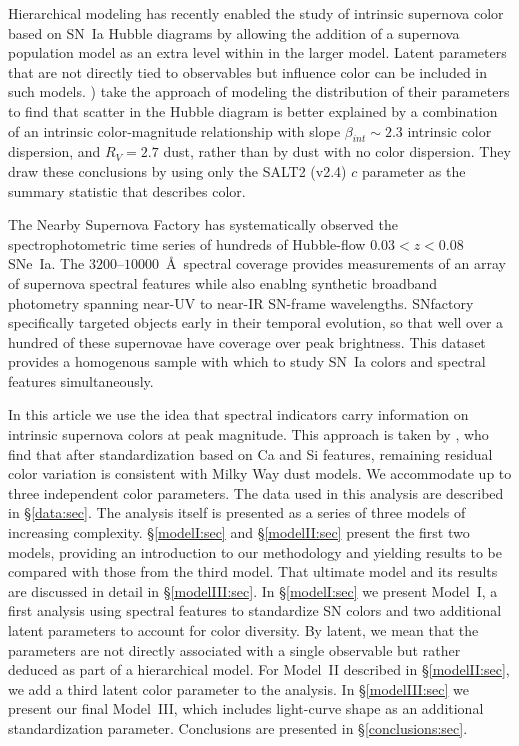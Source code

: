\documentclass[trackchanges]{aastex62}   	%
\begin{document}
Hierarchical modeling has recently enabled
the study of intrinsic supernova color based on SN~Ia Hubble diagrams
by allowing the addition of a supernova population model as an extra level within in the larger model.
Latent parameters that are not directly tied to observables
but  influence color can be included in such models.
\citet{2017ApJ...842...93M} ) take the approach of modeling the distribution of their parameters to find that
scatter in the Hubble diagram is better explained by a combination of 
an intrinsic color-magnitude relationship with slope $\beta_{\mathit{int}}\sim 2.3$ intrinsic
color dispersion,
and
$R_V=2.7$ dust, rather than by dust with no color dispersion.
They draw these conclusions by using only the SALT2 (v2.4)
 $c$
parameter as the summary statistic that describes color.

The Nearby Supernova Factory \citep[SNfactory;][]{2002SPIE.4836...61A} has systematically observed the
spectrophotometric time series of hundreds of Hubble-flow $0.03<z<0.08$ SNe~Ia.   The $3200$--$10000$~\AA\ spectral coverage
provides measurements of an array of supernova spectral features while also enablng synthetic broadband photometry
spanning near-UV to near-IR SN-frame wavelengths.  SNfactory specifically targeted objects
early in their temporal evolution, so that well over a hundred of these supernovae have  coverage over
peak brightness.  This dataset provides a homogenous sample with which to study SN~Ia colors and spectral features simultaneously.

In this article we use the idea that spectral indicators carry information on intrinsic supernova colors at peak magnitude.
This approach is taken by \citet{2011A&A...529L...4C}, who find that after standardization based on Ca and Si features, remaining residual color
variation is consistent with Milky Way dust models.
We accommodate up to  three independent color parameters.
The data used in this analysis are described in \S\ref{data:sec}.
The analysis itself is presented as a series of three models of increasing complexity.
\S\ref{modelI:sec}  and  \S\ref{modelII:sec} present the first two models, providing an introduction to
our methodology and yielding results to be compared with those from the third model.
That ultimate model and its results are discussed in detail in \S\ref{modelIII:sec}. 
In \S\ref{modelI:sec} we present Model~I, 
a first analysis using spectral features to standardize SN colors
and two additional latent parameters to account for color diversity. 
By latent, we mean that the parameters are not directly associated with a single observable but rather deduced
as part of a hierarchical
model.
For Model~II described in \S\ref{modelII:sec}, we add a third latent color parameter to the analysis.
In \S\ref{modelIII:sec} we present our final Model~III, which  includes light-curve shape as an additional standardization parameter.
Conclusions are presented in \S\ref{conclusions:sec}.
\end{document}
